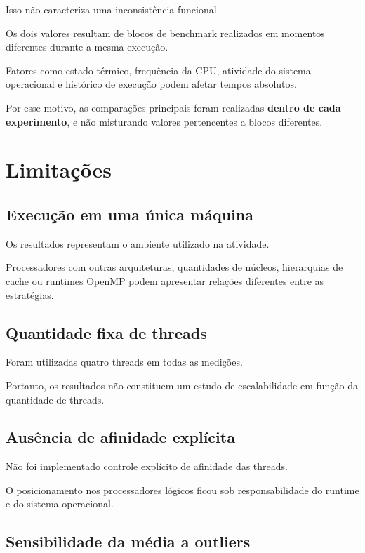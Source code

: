 Isso não caracteriza uma inconsistência funcional.

Os dois valores resultam de blocos de benchmark realizados em momentos
diferentes durante a mesma execução.

Fatores como estado térmico, frequência da CPU, atividade do sistema
operacional e histórico de execução podem afetar tempos absolutos.

Por esse motivo, as comparações principais foram realizadas
\textbf{dentro de cada experimento}, e não misturando valores pertencentes
a blocos diferentes.


\section{Limitações}
\label{sec:atvd07-limitacoes}

\subsection{Execução em uma única máquina}

Os resultados representam o ambiente utilizado na atividade.

Processadores com outras arquiteturas, quantidades de núcleos, hierarquias
de cache ou runtimes OpenMP podem apresentar relações diferentes entre as
estratégias.


\subsection{Quantidade fixa de threads}

Foram utilizadas quatro threads em todas as medições.

Portanto, os resultados não constituem um estudo de escalabilidade em
função da quantidade de threads.


\subsection{Ausência de afinidade explícita}

Não foi implementado controle explícito de afinidade das threads.

O posicionamento nos processadores lógicos ficou sob responsabilidade do
runtime e do sistema operacional.


\subsection{Sensibilidade da média a outliers}

